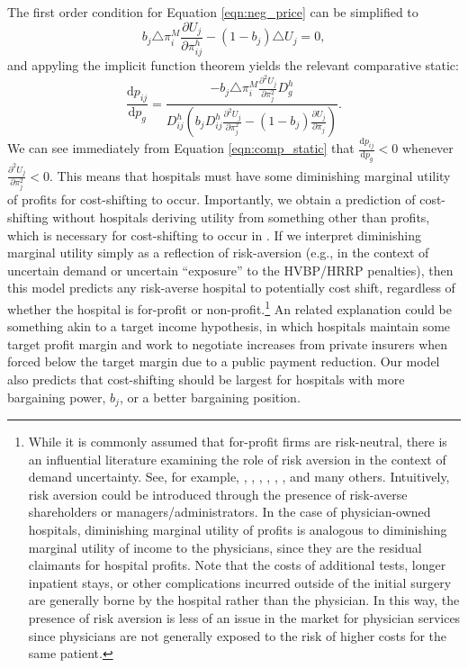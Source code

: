 \documentclass[12pt]{article}
\newcommand{\deriv}[2]{\frac{\mathrm{d}#1}{\mathrm{d}#2}}
\newcommand{\pderiv}[2]{\frac{\partial#1}{\partial#2}}
\begin{document}
The first order condition for Equation \ref{eqn:neg_price} can be simplified to
\begin{equation}
 b_{j} \triangle \pi_{i}^{M} \pderiv{U_{j}}{\pi_{ij}^{h}} - (1-b_{j}) \triangle U_{j} = 0,
\label{eqn:price_foc}
\end{equation}
and appyling the implicit function theorem yields the relevant comparative static:
\begin{equation}
\deriv{p_{ij}}{p_{g}} = \frac{- b_{j} \triangle \pi_{i}^{M} \pderiv{^{2}U_{j}}{\pi_{j}^{2}}D_{g}^{h}}{D_{ij}^{h}\left(b_{j} D_{ij}^{h} \pderiv{^{2}U_{j}}{\pi_{j}^{2}} - (1-b_{j}) \pderiv{U_{j}}{\pi_{j}} \right)}.
\label{eqn:comp_static}
\end{equation}
We can see immediately from Equation \ref{eqn:comp_static} that $\deriv{p_{ij}}{p_{g}}<0$ whenever $\pderiv{^{2}U_{j}}{\pi_{j}^{2}}<0$. This means that hospitals must have some diminishing marginal utility of profits for cost-shifting to occur. Importantly, we obtain a prediction of cost-shifting without hospitals deriving utility from something other than profits, which is necessary for cost-shifting to occur in \cite{dranove1988}. If we interpret diminishing marginal utility simply as a reflection of risk-aversion (e.g., in the context of uncertain demand or uncertain ``exposure'' to the HVBP/HRRP penalties), then this model predicts any risk-averse hospital to potentially cost shift, regardless of whether the hospital is for-profit or non-profit.\footnote{While it is commonly assumed that for-profit firms are risk-neutral, there is an influential literature examining the role of risk aversion in the context of demand uncertainty. See, for example, \cite{sandmo1971}, \cite{holthausen1979}, \cite{mcdonald1985}, \cite{guiso1999}, \cite{chavas1996}, \cite{asplund2002}, and many others. Intuitively, risk aversion could be introduced through the presence of risk-averse shareholders or managers/administrators. In the case of physician-owned hospitals, diminishing marginal utility of profits is analogous to diminishing marginal utility of income to the physicians, since they are the residual claimants for hospital profits. Note that the costs of additional tests, longer inpatient stays, or other complications incurred outside of the initial surgery are generally borne by the hospital rather than the physician. In this way, the presence of risk aversion is less of an issue in the market for physician services since physicians are not generally exposed to the risk of higher costs for the same patient.} An related explanation could be something akin to a target income hypothesis, in which hospitals maintain some target profit margin and work to negotiate increases from private insurers when forced below the target margin due to a public payment reduction. Our model also predicts that cost-shifting should be largest for hospitals with more bargaining power, $b_{j}$, or a better bargaining position.
\end{document}

